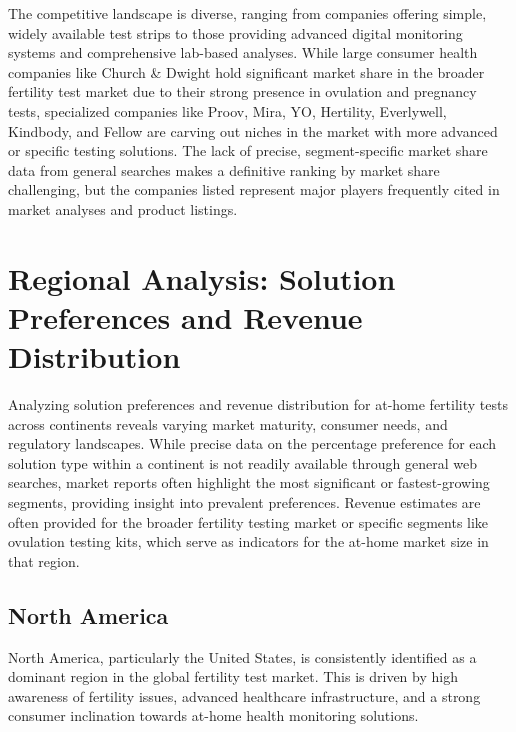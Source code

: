 \documentclass{article}
\begin{document}
The competitive landscape is diverse, ranging from companies offering simple, widely available test strips to those providing advanced digital monitoring systems and comprehensive lab-based analyses. While large consumer health companies like Church \& Dwight hold significant market share in the broader fertility test market due to their strong presence in ovulation and pregnancy tests, specialized companies like Proov, Mira, YO, Hertility, Everlywell, Kindbody, and Fellow are carving out niches in the market with more advanced or specific testing solutions. The lack of precise, segment-specific market share data from general searches makes a definitive ranking by market share challenging, but the companies listed represent major players frequently cited in market analyses and product listings.

\section{Regional Analysis: Solution Preferences and Revenue Distribution}

Analyzing solution preferences and revenue distribution for at-home fertility tests across continents reveals varying market maturity, consumer needs, and regulatory landscapes. While precise data on the percentage preference for each solution type within a continent is not readily available through general web searches, market reports often highlight the most significant or fastest-growing segments, providing insight into prevalent preferences. Revenue estimates are often provided for the broader fertility testing market or specific segments like ovulation testing kits, which serve as indicators for the at-home market size in that region.

\subsection{North America}
North America, particularly the United States, is consistently identified as a dominant region in the global fertility test market. This is driven by high awareness of fertility issues, advanced healthcare infrastructure, and a strong consumer inclination towards at-home health monitoring solutions.
\end{document}
